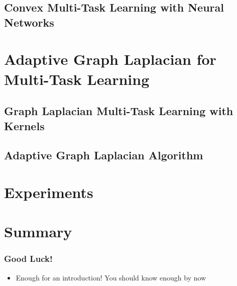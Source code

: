 \documentclass{beamer}
\begin{document}
\subsection{Convex Multi-Task Learning with Neural Networks}

\section{Adaptive Graph Laplacian for Multi-Task Learning}
\subsection{Graph Laplacian Multi-Task Learning with Kernels}

\subsection{Adaptive Graph Laplacian Algorithm}

\section{Experiments}

\section{Summary}

\begin{frame}
\frametitle{Good Luck!}
\begin{itemize}
\item Enough for an introduction! You should know enough by now
\end{itemize}
\end{frame}

\backmatter
\end{document}
